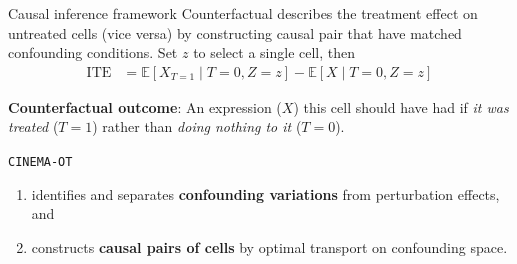 \documentclass[10pt]{beamer}
\begin{document}


\begin{frame}{Causal inference framework}
    Counterfactual describes the treatment effect on untreated cells (vice versa) 
    by constructing causal pair that have matched confounding conditions. 
    Set {$z$ to select a single cell}, then
    \begin{align}
        \text{ITE} & = \mathbb{E}[X_{T=1}\mid T=0, Z=z] - \mathbb{E}[X\mid T=0, Z=z]
    \end{align}
    
    \begin{definition}[Counterfactual]
        \textbf{Counterfactual outcome}: An expression ($X$) this cell should have had if \textit{it was treated} ($T=1$) rather than \textit{doing nothing to it} ($T=0$).
    \end{definition}
    \medskip

    \begin{framed}
    \texttt{CINEMA-OT}
    \begin{enumerate}
        \item identifies and separates \textbf{confounding variations} from perturbation effects, and
        \item constructs \textbf{causal pairs of cells} by optimal transport on confounding space.
    \end{enumerate}  
    \end{framed}
\end{frame}
\end{document}
